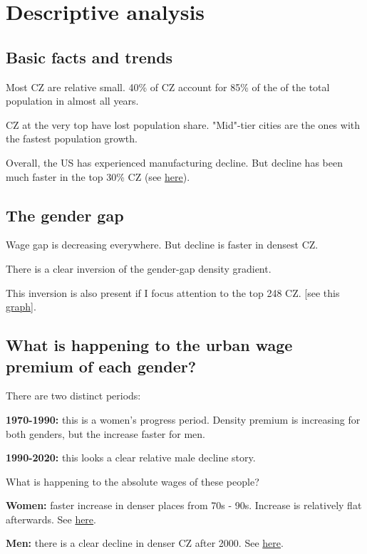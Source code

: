 \section{Descriptive analysis}
\subsection{Basic facts and trends}
\bitem
\item Most CZ are relative small. 40\% of CZ account for 85\% of the of the total population in almost all years.
\item CZ at the very top have lost population share. "Mid"-tier cities are the ones with the fastest population growth.
\item Overall, the US has experienced manufacturing decline. But decline has been much faster in the top 30\% CZ (see \href{https://www.dropbox.com/s/cp9v7uk87lyij4r/bar_deciles_manufacturing.png?dl=0}{here}).
\item 

\eitem

\subsection{The gender gap}
\bitem
\item Wage gap is decreasing everywhere. But decline is faster in densest CZ.
\item There is a clear inversion of the gender-gap density gradient. 
\item This inversion is also present if I focus attention to the top 248 CZ. 
[see this \href{https://www.dropbox.com/s/yytq0djtbb8lb5i/bar_graph_deviation_from_mean.png?dl=0}{graph}].

\item
\eitem
\subsection{What is happening to the urban wage premium of each gender?}
There are two distinct periods:
\bitem
	\item \textbf{1970-1990:} this is a women's progress period. Density premium is increasing for both genders, but the increase faster for men.
	\item \textbf{1990-2020:} this looks a clear relative male decline story.
\eitem

What is happening to the absolute wages of these people?

\bitem
	\item \textbf{Women:} faster increase in denser places from 70s - 90s. Increase is relatively flat afterwards. See \href{https://www.dropbox.com/s/cwuy5a3rduk6ph9/d_wage_deciles_women.png?dl=0}{here}.
	\item \textbf{Men:} there is a clear decline in denser CZ after 2000. See \href{https://www.dropbox.com/s/19e7o1raaanezug/d_wage_deciles_men.png?dl=0}{here}.
\eitem 


